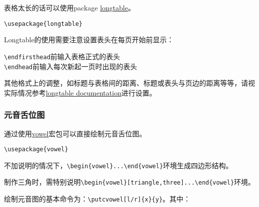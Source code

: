 \documentclass[a4paper,12pt]{article}
\begin{document}
\vspace{3mm}
表格太长的话可以使用package \href{https://www.ctan.org/pkg/longtable}{longtable}。

\verb|\usepackage{longtable}|


Longtable的使用需要注意设置表头在每页开始前显示：

\verb|\endfirsthead|前输入表格正式的表头\\
\indent \verb|\endhead|前输入每次新起一页时出现的表头

其他格式上的调整，如标题与表格间的距离、标题或表头与页边的距离等等，请视实际情况参考\href{https://mirror.koddos.net/CTAN/macros/latex/required/tools/longtable.pdf}{longtable documentation}进行设置。

\subsubsection{元音舌位图}

通过使用\href{https://www.ctan.org/pkg/vowel}{vowel}宏包可以直接绘制元音舌位图。

\verb|\usepackage{vowel}|

\vspace{5mm}
不加说明的情况下，\verb|\begin{vowel}...\end{vowel}|环境生成四边形结构。

\begin{center}
	\begin{vowel}
	\end{vowel}
\end{center}


制作三角时，需特别说明\verb|\begin{vowel}[triangle,three]...\end{vowel}|环境。

\begin{center}
	\begin{vowel}
	\end{vowel}
\end{center}

\vspace{5mm}
绘制元音图的基本命令为：\verb|\putcvowel[l/r]{x}{y}|。其中：
\end{document}
